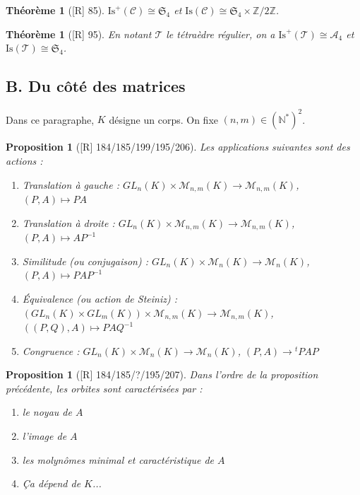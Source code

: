 \documentclass[10pt, a4paper, parskip=full, twoside, twocolumn]{report}
\newtheorem{theorem}[definition]{Théorème}
\newtheorem{proposition}[definition]{Proposition}
\newcommand{\IN}{\mathbb{N}}
\newcommand{\IZ}{\mathbb{Z}}
\begin{document}
\begin{tcolorbox}[
    breakable, %
    colback=developpement, %
    colframe=gray!0!black, %
    boxrule=0pt, %
    arc=1mm, %
	boxsep=0pt,
	left=0pt, right=0pt, top=0pt, bottom=0pt
]
\begin{theorem}[\textnormal{[R] 85}]
	\label{dev1}
	$\text{Is}^+(\mathcal{C})\cong \mathfrak{S}_4$ et $\text{Is}(\mathcal{C})\cong \mathfrak{S}_4\times \IZ/2\IZ$.
\end{theorem}
\end{tcolorbox}

\begin{theorem}[\textnormal{[R] 95}]
	En notant $\mathcal{T}$ le tétraèdre régulier, on a $\text{Is}^+(\mathcal{T})\cong \mathcal{A}_4$ et $\text{Is}(\mathcal{T})\cong \mathfrak{S}_4$.
\end{theorem}

\subsection*{B. Du côté des matrices}
Dans ce paragraphe, $K$ désigne un corps. On fixe $(n,m)\in \left(\IN^*\right)^2$.

\begin{proposition}[\textnormal{[R] 184/185/199/195/206}]
	Les applications suivantes sont des actions :
	\begin{enumerate}
		\item Translation à gauche : $GL_n(K)\times \mathcal{M}_{n,m}(K)\to\mathcal{M}_{n,m}(K)$, $(P,A)\mapsto PA$
		\item Translation à droite : $GL_n(K)\times \mathcal{M}_{n,m}(K)\to\mathcal{M}_{n,m}(K)$, $(P,A)\mapsto AP^{-1}$
		\item Similitude (ou conjugaison) : $GL_n(K)\times \mathcal{M}_{n}(K)\to\mathcal{M}_{n}(K)$, $(P,A)\mapsto PAP^{-1}$
		\item Équivalence (ou \emph{action de Steiniz}) : $\left(GL_n(K)\times GL_m(K)\right)\times \mathcal{M}_{n,m}(K)\to\mathcal{M}_{n,m}(K)$, $\left(\left(P, Q\right), A\right) \mapsto PAQ^{-1}$
		\item Congruence : $GL_n(K)\times \mathcal{M}_{n}(K)\to\mathcal{M}_{n}(K)$, $(P,A)\to {}^tPAP$
	\end{enumerate}
\end{proposition}

\begin{proposition}[\textnormal{[R] 184/185/?/195/207}]
	Dans l'ordre de la proposition précédente, les orbites sont caractérisées par :
	\begin{enumerate}
		\item le noyau de $A$
		\item l'image de $A$
		\item les molynômes minimal et caractéristique de $A$
		\item Ça dépend de $K$...
	\end{enumerate}
\end{proposition}
\end{document}
